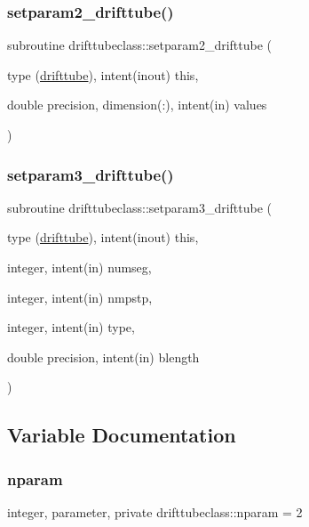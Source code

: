 \mbox{\label{namespacedrifttubeclass_a3883fd9688d0b98e279f57547de67b8c}} 
\subsubsection{\texorpdfstring{setparam2\_drifttube()}{setparam2\_drifttube()}}
{\footnotesize\ttfamily subroutine drifttubeclass\+::setparam2\+\_\+drifttube (\begin{DoxyParamCaption}\item[{type (\mbox{\hyperlink{namespacedrifttubeclass_structdrifttubeclass_1_1drifttube}{drifttube}}), intent(inout)}]{this,  }\item[{double precision, dimension(\+:), intent(in)}]{values }\end{DoxyParamCaption})}

\mbox{\label{namespacedrifttubeclass_a5c05a55ca0f98570b2b02f3c84181015}} 
\subsubsection{\texorpdfstring{setparam3\_drifttube()}{setparam3\_drifttube()}}
{\footnotesize\ttfamily subroutine drifttubeclass\+::setparam3\+\_\+drifttube (\begin{DoxyParamCaption}\item[{type (\mbox{\hyperlink{namespacedrifttubeclass_structdrifttubeclass_1_1drifttube}{drifttube}}), intent(inout)}]{this,  }\item[{integer, intent(in)}]{numseg,  }\item[{integer, intent(in)}]{nmpstp,  }\item[{integer, intent(in)}]{type,  }\item[{double precision, intent(in)}]{blength }\end{DoxyParamCaption})}



\subsection{Variable Documentation}
\mbox{\label{namespacedrifttubeclass_af382d7cef81496c1d2c2bf3ba72c4350}} 
\subsubsection{\texorpdfstring{nparam}{nparam}}
{\footnotesize\ttfamily integer, parameter, private drifttubeclass\+::nparam = 2\hspace{0.3cm}{\ttfamily [private]}}

